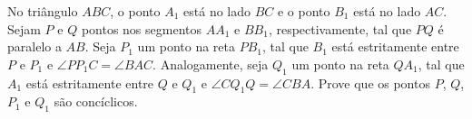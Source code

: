 No triângulo $ABC$, o ponto $A_1$ está no lado $BC$ e o ponto $B_1$ está no lado $AC$. Sejam
$P$ e $Q$ pontos nos segmentos $AA_1$ e $BB_1$, respectivamente, tal que $PQ$ é paralelo a $AB$. Seja $P_1$ um
ponto na reta $PB_1$, tal que $B_1$ está estritamente entre $P$ e $P_1$ e $\angle PP_1C = \angle BAC$. Analogamente,
seja $Q_1$ um ponto na reta $QA_1$, tal que $A_1$ está estritamente entre $Q$ e $Q_1$ e $\angle CQ_1Q = \angle CBA$.
Prove que os pontos $P$, $Q$, $P_1$ e $Q_1$ são concíclicos.
